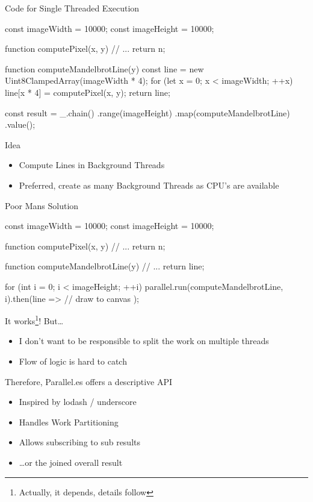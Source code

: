 \begin{frame}{Code for Single Threaded Execution}
		\begin{javascriptcode}
const imageWidth = 10000;
const imageHeight = 10000;

function computePixel(x, y) {
	// ...
	return n;
}

function computeMandelbrotLine(y) {
	const line = new Uint8ClampedArray(imageWidth * 4);
	for (let x = 0; x < imageWidth; ++x) {
		line[x * 4] = computePixel(x, y);
	}
	return line;
}

const result = _.chain()
	.range(imageHeight)
	.map(computeMandelbrotLine)
	.value();
\end{javascriptcode}
\end{frame}

\begin{frame}{Idea}
	\begin{itemize}
		\item Compute Lines in Background Threads
		\item Preferred, create as many Background Threads as CPU's are available
	\end{itemize}
\end{frame}

\begin{frame}[fragile]{Poor Mans Solution}
	\begin{javascriptcode}
const imageWidth = 10000;
const imageHeight = 10000;

function computePixel(x, y) {
	// ...
	return n;
}

function computeMandelbrotLine(y) {
	// ...
	return line;
}

for (int i = 0; i < imageHeight; ++i) {
	parallel.run(computeMandelbrotLine, i).then(line => {
		// draw to canvas
	});
}
	\end{javascriptcode}
\end{frame}

\begin{frame}{It works\footnote{Actually, it depends, details follow}! But\dots}
	\begin{itemize}
		\item I don't want to be responsible to split the work on multiple threads
		\item Flow of logic is hard to catch
	\end{itemize}
\end{frame}

\begin{frame}{Therefore, Parallel.es offers a descriptive API}
	\begin{itemize}
		\item Inspired by lodash / underscore
		\item Handles Work Partitioning
		\item Allows subscribing to sub results
		\item \dots or the joined overall result
	\end{itemize}
\end{frame}

